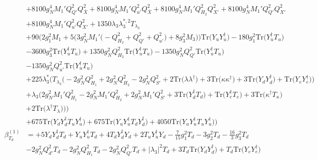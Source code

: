 {\begin{align}
 &+8100 g_{N}^{4} M_1' Q_{Q'}^{2} Q_{\bar{X}}^{2} +8100 g_{N}^{4} M_1' Q_{u'}^{2} Q_{\bar{X}}^{2} +8100 g_{N}^{4} M_1' Q_{H_2}^{2} Q_{X'}^{2} +8100 g_{N}^{4} M_1' Q_{Q'}^{2} Q_{X'}^{2} \nonumber \\ 
 &+8100 g_{N}^{4} M_1' Q_{u'}^{2} Q_{X'}^{2} +1350 \lambda_3 \lambda_{3}^{*,2} T_{\lambda_3} \nonumber \\ 
 &+90 \Big(2 g_{1}^{2} M_1  + 5 \Big(3 g_{N}^{2} M_1' \Big(- Q_{H_2}^{2}  + Q_{Q'}^{2} + Q_{u'}^{2}\Big) + 8 g_{3}^{2} M_3 \Big)\Big)\mbox{Tr}\Big({Y_u  Y_{u}^{\dagger}}\Big) -180 g_{1}^{2} \mbox{Tr}\Big({Y_{u}^{\dagger}  T_u}\Big) \nonumber \\ 
 &-3600 g_{3}^{2} \mbox{Tr}\Big({Y_{u}^{\dagger}  T_u}\Big) +1350 g_{N}^{2} Q_{H_2}^{2} \mbox{Tr}\Big({Y_{u}^{\dagger}  T_u}\Big) -1350 g_{N}^{2} Q_{Q'}^{2} \mbox{Tr}\Big({Y_{u}^{\dagger}  T_u}\Big) \nonumber \\ 
 &-1350 g_{N}^{2} Q_{u'}^{2} \mbox{Tr}\Big({Y_{u}^{\dagger}  T_u}\Big) \nonumber \\ 
 &+225 \lambda_3^* \Big(T_{\lambda_3} \Big(-2 g_{N}^{2} Q_{H_1}^{2}  + 2 g_{N}^{2} Q_{H_2}^{2}  -2 g_{N}^{2} Q_{S'}^{2}  + 2 \mbox{Tr}\Big({\lambda  \lambda^{\dagger}}\Big)  + 3 \mbox{Tr}\Big({\kappa  \kappa^{\dagger}}\Big)  + 3 \mbox{Tr}\Big({Y_d  Y_{d}^{\dagger}}\Big)  + \mbox{Tr}\Big({Y_e  Y_{e}^{\dagger}}\Big)\Big)\nonumber \\ 
 &+\lambda_3 \Big(2 g_{N}^{2} M_1' Q_{H_1}^{2} -2 g_{N}^{2} M_1' Q_{H_2}^{2} +2 g_{N}^{2} M_1' Q_{S'}^{2} +3 \mbox{Tr}\Big({Y_{d}^{\dagger}  T_d}\Big) +\mbox{Tr}\Big({Y_{e}^{\dagger}  T_e}\Big)+3 \mbox{Tr}\Big({\kappa^{\dagger}  T_{\kappa}}\Big) \nonumber \\ 
 &+2 \mbox{Tr}\Big({\lambda^{\dagger}  T_{\lambda}}\Big) \Big)\Big)\nonumber \\ 
 &+675 \mbox{Tr}\Big({Y_d  Y_{d}^{\dagger}  T_u  Y_{u}^{\dagger}}\Big) +675 \mbox{Tr}\Big({Y_u  Y_{u}^{\dagger}  T_d  Y_{d}^{\dagger}}\Big) +4050 \mbox{Tr}\Big({Y_u  Y_{u}^{\dagger}  T_u  Y_{u}^{\dagger}}\Big) \Big)\\ 
\beta_{T_d}^{(1)} & =  
+5 {Y_d  Y_{d}^{\dagger}  T_d} +{Y_u  Y_{u}^{\dagger}  T_d}+4 {T_d  Y_{d}^{\dagger}  Y_d} +2 {T_u  Y_{u}^{\dagger}  Y_d} -\frac{7}{15} g_{1}^{2} T_d -3 g_{2}^{2} T_d -\frac{16}{3} g_{3}^{2} T_d \nonumber \\ 
 &-2 g_{N}^{2} Q_{d'}^{2} T_d -2 g_{N}^{2} Q_{H_1}^{2} T_d -2 g_{N}^{2} Q_{Q'}^{2} T_d +|\lambda_3|^2 T_d +3 T_d \mbox{Tr}\Big({Y_d  Y_{d}^{\dagger}}\Big) +T_d \mbox{Tr}\Big({Y_e  Y_{e}^{\dagger}}\Big) \nonumber \\ 

\end{align}}

